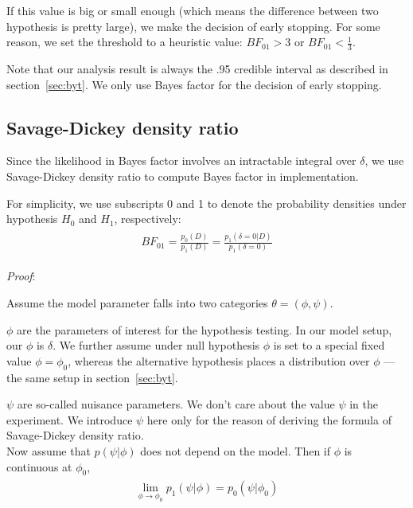 \documentclass[paper=a4, fontsize=11pt]{scrartcl} %
\numberwithin{equation}{section} %
\numberwithin{figure}{section} %
\numberwithin{table}{section} %
\begin{document}
If this value is big or small enough (which means the difference between two hypothesis is pretty large), we make the decision of early stopping.
For some reason, we set the threshold to a heuristic value: $BF_{01}  >3$ or $BF_{01}  < \frac{1}{3}$.

Note that our analysis result is always the .95 credible interval as described in section~\ref{sec:byt}. We only use Bayes factor for the decision of early stopping. 

\subsection{Savage-Dickey density ratio}
Since the likelihood in Bayes factor involves an intractable integral over $\delta$, we use Savage-Dickey density ratio to compute Bayes factor in implementation. 

For simplicity, we use subscripts 0 and 1 to denote the probability densities under hypothesis $H_0$ and $H_1$, respectively:
\begin{align}
\begin{split}
BF_{01} = \frac{p_0(D)}{p_1(D)} = \frac{p_1(\delta=0 | D)}{p_1(\delta=0)}
\end{split}
\end{align}

\emph{Proof}:

Assume the model parameter falls into two categories $\theta = (\phi, \psi)$.

$\phi$ are the parameters of interest for the hypothesis testing. In our model setup, our $\phi$ is $\delta$. We further assume under null hypothesis $\phi$ is set to a special fixed value $\phi = \phi_0$, whereas the alternative hypothesis places a distribution over $\phi$ --- the same setup in section~\ref{sec:byt}.

$\psi$ are so-called nuisance parameters. We don't care about the value $\psi$ in the experiment. We introduce $\psi$ here only for the reason of deriving the formula of Savage-Dickey density ratio. \\

Now assume that $p( \psi | \phi)$ does not depend on the model. Then if $\phi$ is continuous at $\phi_0$, 
\begin{align}
\begin{split}
\lim_{\phi \rightarrow \phi_0} {p_1( \psi | \phi) = p_0(\psi | \phi_0)} 
\end{split}
\end{align}
\end{document}
